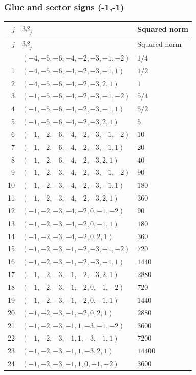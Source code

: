 \subsubsection{Glue and sector signs (-1,-1)}

\begingroup\scriptsize
\setlength{\tabcolsep}{5pt}
\begin{longtable}{@{}rll@{}}
\toprule
$j$ & $3\beta_j$ & Squared norm\\
\midrule\endfirsthead
\toprule
$j$ & $3\beta_j$ & Squared norm\\
\midrule\endhead
\bottomrule\endfoot
0 & $(-4,-5,-6,-4,-2,-3,-1,-2)$ & $1/4$\\
1 & $(-4,-5,-6,-4,-2,-3,-1,1)$ & $1/2$\\
2 & $(-4,-5,-6,-4,-2,-3,2,1)$ & $1$\\
3 & $(-1,-5,-6,-4,-2,-3,-1,-2)$ & $5/4$\\
4 & $(-1,-5,-6,-4,-2,-3,-1,1)$ & $5/2$\\
5 & $(-1,-5,-6,-4,-2,-3,2,1)$ & $5$\\
6 & $(-1,-2,-6,-4,-2,-3,-1,-2)$ & $10$\\
7 & $(-1,-2,-6,-4,-2,-3,-1,1)$ & $20$\\
8 & $(-1,-2,-6,-4,-2,-3,2,1)$ & $40$\\
9 & $(-1,-2,-3,-4,-2,-3,-1,-2)$ & $90$\\
10 & $(-1,-2,-3,-4,-2,-3,-1,1)$ & $180$\\
11 & $(-1,-2,-3,-4,-2,-3,2,1)$ & $360$\\
12 & $(-1,-2,-3,-4,-2,0,-1,-2)$ & $90$\\
13 & $(-1,-2,-3,-4,-2,0,-1,1)$ & $180$\\
14 & $(-1,-2,-3,-4,-2,0,2,1)$ & $360$\\
15 & $(-1,-2,-3,-1,-2,-3,-1,-2)$ & $720$\\
16 & $(-1,-2,-3,-1,-2,-3,-1,1)$ & $1440$\\
17 & $(-1,-2,-3,-1,-2,-3,2,1)$ & $2880$\\
18 & $(-1,-2,-3,-1,-2,0,-1,-2)$ & $720$\\
19 & $(-1,-2,-3,-1,-2,0,-1,1)$ & $1440$\\
20 & $(-1,-2,-3,-1,-2,0,2,1)$ & $2880$\\
21 & $(-1,-2,-3,-1,1,-3,-1,-2)$ & $3600$\\
22 & $(-1,-2,-3,-1,1,-3,-1,1)$ & $7200$\\
23 & $(-1,-2,-3,-1,1,-3,2,1)$ & $14400$\\
24 & $(-1,-2,-3,-1,1,0,-1,-2)$ & $3600$\\

\end{longtable}
